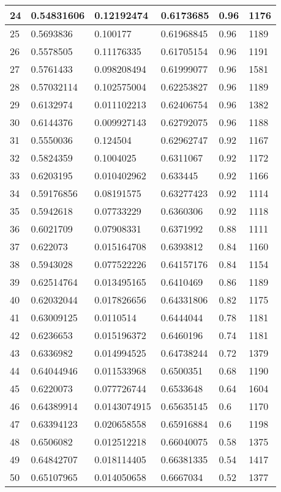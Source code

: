 \begin{longtable}{|l|l|l|l|l|l|}
24 & 0.54831606 & 0.12192474 & 0.6173685 & 0.96 & 1176 \\ \hline 
25 & 0.5693836 & 0.100177 & 0.61968845 & 0.96 & 1189 \\ \hline 
26 & 0.5578505 & 0.11176335 & 0.61705154 & 0.96 & 1191 \\ \hline 
27 & 0.5761433 & 0.098208494 & 0.61999077 & 0.96 & 1581 \\ \hline 
28 & 0.57032114 & 0.102575004 & 0.62253827 & 0.96 & 1189 \\ \hline 
29 & 0.6132974 & 0.011102213 & 0.62406754 & 0.96 & 1382 \\ \hline 
30 & 0.6144376 & 0.009927143 & 0.62792075 & 0.96 & 1188 \\ \hline 
31 & 0.5550036 & 0.124504 & 0.62962747 & 0.92 & 1167 \\ \hline 
32 & 0.5824359 & 0.1004025 & 0.6311067 & 0.92 & 1172 \\ \hline 
33 & 0.6203195 & 0.010402962 & 0.633445 & 0.92 & 1166 \\ \hline 
34 & 0.59176856 & 0.08191575 & 0.63277423 & 0.92 & 1114 \\ \hline 
35 & 0.5942618 & 0.07733229 & 0.6360306 & 0.92 & 1118 \\ \hline 
36 & 0.6021709 & 0.07908331 & 0.6371992 & 0.88 & 1111 \\ \hline 
37 & 0.622073 & 0.015164708 & 0.6393812 & 0.84 & 1160 \\ \hline 
38 & 0.5943028 & 0.077522226 & 0.64157176 & 0.84 & 1154 \\ \hline 
39 & 0.62514764 & 0.013495165 & 0.6410469 & 0.86 & 1189 \\ \hline 
40 & 0.62032044 & 0.017826656 & 0.64331806 & 0.82 & 1175 \\ \hline 
41 & 0.63009125 & 0.0110514 & 0.6444044 & 0.78 & 1181 \\ \hline 
42 & 0.6236653 & 0.015196372 & 0.6460196 & 0.74 & 1181 \\ \hline 
43 & 0.6336982 & 0.014994525 & 0.64738244 & 0.72 & 1379 \\ \hline 
44 & 0.64044946 & 0.011533968 & 0.6500351 & 0.68 & 1190 \\ \hline 
45 & 0.6220073 & 0.077726744 & 0.6533648 & 0.64 & 1604 \\ \hline 
46 & 0.64389914 & 0.0143074915 & 0.65635145 & 0.6 & 1170 \\ \hline 
47 & 0.63394123 & 0.020658558 & 0.65916884 & 0.6 & 1198 \\ \hline 
48 & 0.6506082 & 0.012512218 & 0.66040075 & 0.58 & 1375 \\ \hline 
49 & 0.64842707 & 0.018114405 & 0.66381335 & 0.54 & 1417 \\ \hline 
50 & 0.65107965 & 0.014050658 & 0.6667034 & 0.52 & 1377 \\ \hline 
\end{longtable}